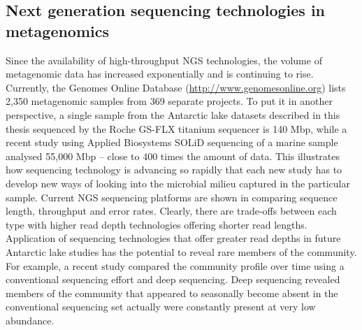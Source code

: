 \subsection{Next generation sequencing technologies in metagenomics}
Since the availability of high-throughput \ac{NGS} technologies, the volume of metagenomic data has increased exponentially and is continuing to rise.
Currently, the Genomes Online Database (\url{http://www.genomesonline.org}) lists 2,350 metagenomic samples from 369 separate projects.
To put it in another perspective, a single sample from the Antarctic lake datasets described in this thesis sequenced by the Roche GS-FLX titanium sequencer is 140 Mbp, while a recent study using Applied Biosystems SOLiD sequencing of a marine sample \cite{Iverson2012} analysed 55,000 Mbp -- close to 400 times the amount of data.
This illustrates how sequencing technology is advancing so rapidly that each new study has to develop new ways of looking into the microbial milieu captured in the particular sample.
Current \ac{NGS} sequencing platforms are shown in  comparing sequence length, throughput and error rates.
Clearly, there are trade-offs between each type with higher read depth technologies offering shorter read lengths. 
Application of sequencing technologies that offer greater read depths in future Antarctic lake studies has the potential to reveal rare members of the community.
For example, a recent study compared the community profile over time using a conventional sequencing effort and deep sequencing.
Deep sequencing revealed members of the community that appeared to seasonally become absent in the conventional sequencing set actually were constantly present at very low abundance. %


